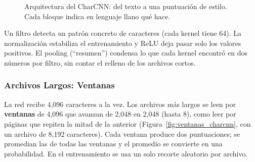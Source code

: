 \begin{figure}[H]
    \caption{Arquitectura del CharCNN: del texto a una puntuación de estilo. Cada bloque indica en lenguaje llano qué hace.}
    \label{fig:arquitectura_charcnn}
\end{figure}

Un filtro detecta un patrón concreto de caracteres (cada kernel tiene 64). La normalización estabiliza el entrenamiento y ReLU deja pasar solo los valores positivos. El pooling (``resumen'') condensa lo que cada kernel encontró en dos números por filtro, sin contar el relleno de los archivos cortos.

\subsubsection{Archivos Largos: Ventanas}
La red recibe 4,096 caracteres a la vez. Los archivos más largos se leen por \textbf{ventanas} de 4,096 que avanzan de 2,048 en 2,048 (hasta 8), como leer por páginas que repiten la mitad de la anterior (Figura~\ref{fig:ventanas_charcnn}, con un archivo de 8,192 caracteres). Cada ventana produce dos puntuaciones; se promedian las de todas las ventanas y el promedio se convierte en una probabilidad. En el entrenamiento se usa un solo recorte aleatorio por archivo.

